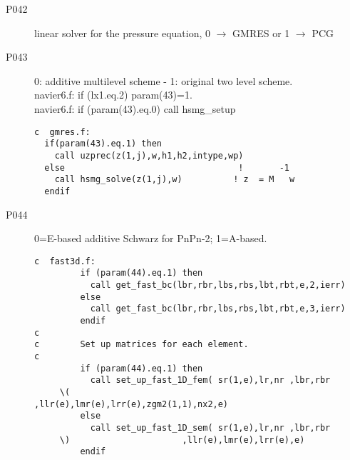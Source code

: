 \begin{description}
\item [P042  ] linear solver for the pressure equation, 0 \(\rightarrow\) GMRES or 1 \(\rightarrow\) PCG
\item [P043  ] 0: additive multilevel scheme - 1: original two level scheme.\\
navier6.f:      if (lx1.eq.2) param(43)=1.\\   
navier6.f:            if (param(43).eq.0) call hsmg\_setup         
\begin{lstlisting}
c  gmres.f:  
  if(param(43).eq.1) then
    call uzprec(z(1,j),w,h1,h2,intype,wp)
  else                                  !       -1
    call hsmg_solve(z(1,j),w)          ! z  = M   w
  endif   
\end{lstlisting} 
\item [P044  ] 0=E-based additive Schwarz for PnPn-2; 1=A-based.
\begin{lstlisting}
c  fast3d.f:
         if (param(44).eq.1) then
           call get_fast_bc(lbr,rbr,lbs,rbs,lbt,rbt,e,2,ierr)
         else
           call get_fast_bc(lbr,rbr,lbs,rbs,lbt,rbt,e,3,ierr)
         endif
c
c        Set up matrices for each element.
c
         if (param(44).eq.1) then
           call set_up_fast_1D_fem( sr(1,e),lr,nr ,lbr,rbr
     \(                      ,llr(e),lmr(e),lrr(e),zgm2(1,1),nx2,e)
         else
           call set_up_fast_1D_sem( sr(1,e),lr,nr ,lbr,rbr
     \)                      ,llr(e),lmr(e),lrr(e),e)
         endif


\end{lstlisting}
\end{description}
